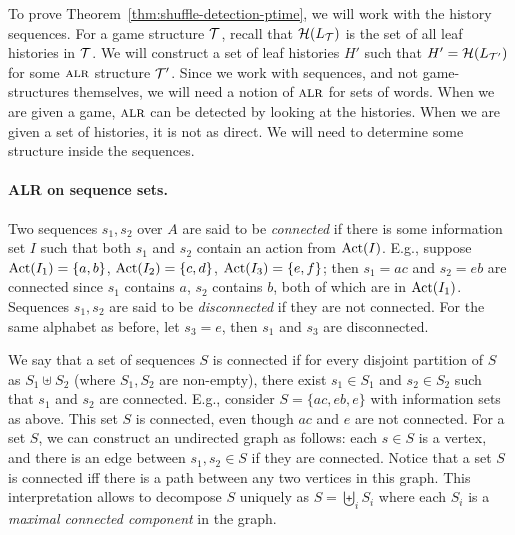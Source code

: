 To prove Theorem~\ref{thm:shuffle-detection-ptime}, we will work with
the history sequences. For a game structure $\mathcal{T}$, recall that
$\mathcal{H}(L_{\mathcal{T}})$ is the set of all leaf histories in $\mathcal{T}$. We will
construct a set of leaf histories $H'$ such that $H' = \mathcal{H}(L_{\mathcal{T}'})$
for some $\textsc{alr}$ structure $\mathcal{T}'$. Since we work with sequences, and
not game-structures themselves, we will need a notion of $\textsc{alr}$ for
sets of words. When we are given a game, $\textsc{alr}$ can be detected by
looking at the histories. When we are given a set of histories, it is
not as direct. We will need to determine some structure inside the
sequences.


\paragraph*{ALR on sequence sets.} 

Two sequences $s_1, s_2$ over $A$ are said to be \emph{connected} if
there is some information set $I$ such that both $s_1$ and $s_2$
contain an action from $\operatorname{Act}(I)$. E.g., suppose
$\operatorname{Act}(I_1) = \{a, b\}$, $\operatorname{Act}(I_2) = \{c, d\}$, $\operatorname{Act}(I_3) = \{e,f\}$; then $s_1 = ac$ and
$s_2 = eb$ are connected since $s_1$ contains $a$, $s_2$ contains $b$,
both of which are in $\operatorname{Act}(I_1)$. Sequences $s_1, s_2$ are said to be
\emph{disconnected} if they are not connected. For the same alphabet
as before, let $s_3 = e$, then $s_1$ and $s_3$ are disconnected.

We say that a set of sequences $S$ is connected if for every disjoint
partition of $S$ as $S_1 \uplus S_2$ (where $S_1, S_2$ are non-empty),
there exist $s_1 \in S_1$ and $s_2 \in S_2$ such that $s_1$ and $s_2$
are connected. E.g., consider $S = \{ac, eb, e\}$ with
information sets as above. This set $S$ is connected, even though $ac$
and $e$ are not connected. For a set $S$, we can construct an
undirected graph as follows: each $s \in S$ is a vertex, and there is
an edge between $s_1, s_2 \in S$ if they are connected. Notice that a
set $S$ is connected iff there is a path between any two vertices in
this graph. This interpretation allows to decompose $S$ uniquely as
$S = \biguplus_i S_i$ where each $S_i$ is a
\emph{maximal connected component} in the graph.


